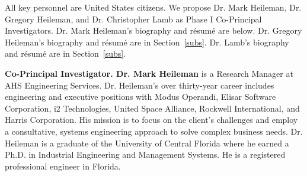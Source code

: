 \documentclass{sbir}
\begin{document}
\label{Key_Personnel}
All key personnel are United States citizens. We propose Dr. Mark Heileman, Dr. Gregory Heileman, and Dr. Christopher Lamb as Phase I Co-Principal Investigators. Dr. Mark Heileman's biography and r\'esum\'e are below. Dr. Gregory Heileman's biography and r\'esum\'e are in Section~\ref{subs}. Dr. Lamb's biography and r\'esum\'e are in Section~\ref{subs}.
\vspace{-0.1in}
\begin{center}
\end{center}

\vspace{-6pt}

{\bfseries Co-Principal Investigator. Dr. Mark Heileman} is a Research Manager at AHS Engineering Services. Dr. Heileman's over thirty-year career includes engineering and executive positions with Modus Operandi, Elisar Software Corporation, i2 Technologies, United Space Alliance, Rockwell International, and Harris Corporation. His mission is to focus on the client's challenges and employ a consultative, systems engineering approach to solve complex business needs. Dr. Heileman is a graduate of the University of Central Florida where he earned a Ph.D. in Industrial Engineering and Management Systems. He is a registered professional engineer in Florida.
\end{document}
